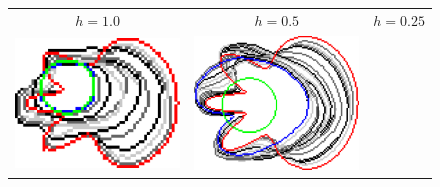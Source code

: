\begin{figure}
\center
\begin{tabular}{ccc}
$h=1.0$ & $h=0.5$ & $h=0.25$\\[2em]
\includegraphics[scale=0.25]{figures/chapter5/flow/flower/radius_3/mdca/elastica/len_pen_0.01000/jonctions_1/curve_segs_4/best/gs_1.00000/summary.pdf} &
\includegraphics[scale=0.25]{figures/chapter5/flow/flower/radius_3/mdca/elastica/len_pen_0.01000/jonctions_1/curve_segs_4/best/gs_0.50000/summary.pdf} &

\end{tabular}
\end{figure}
